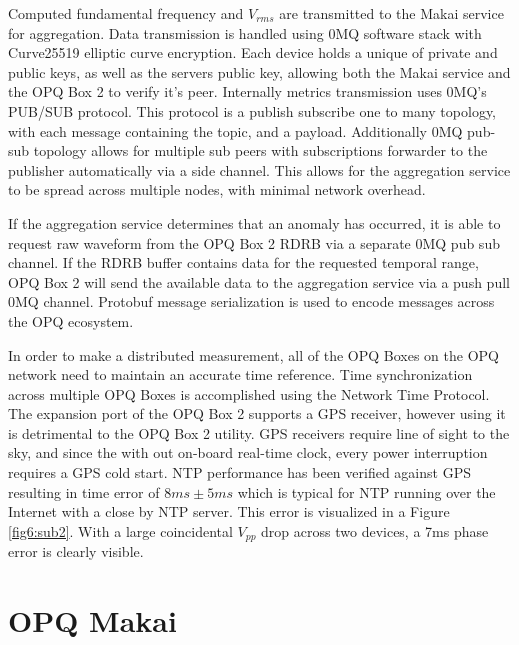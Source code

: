 Computed fundamental frequency and $V_{rms}$ are transmitted to the Makai service for aggregation. Data transmission is handled using 0MQ software stack with Curve25519 elliptic curve encryption. Each device holds a unique of private and public keys, as well as the servers public key, allowing both the Makai service and the OPQ Box 2 to verify it's peer. Internally metrics transmission uses 0MQ's PUB/SUB protocol. This protocol is a publish subscribe one to many topology, with each message containing the topic, and a payload. Additionally 0MQ pub-sub topology allows for multiple sub peers with subscriptions forwarder to the publisher automatically via a side channel. This allows for the aggregation service to be spread across multiple nodes, with minimal network overhead.

If the aggregation service determines that an anomaly has occurred, it is able to request raw waveform from the OPQ Box 2 RDRB via a separate 0MQ pub sub channel. If the RDRB buffer contains data for the requested temporal range, OPQ Box 2 will send the available data to the aggregation service via a push pull 0MQ channel. Protobuf message serialization is used to encode messages across the OPQ ecosystem. 

In order to make a distributed measurement, all of the OPQ Boxes on the OPQ network need to maintain an accurate time reference. Time synchronization across multiple OPQ Boxes is accomplished using the Network Time Protocol. The expansion port of the OPQ Box 2 supports a GPS receiver, however using it is detrimental to the OPQ Box 2 utility. GPS receivers require line of sight to the sky, and since the with out on-board real-time clock, every power interruption requires a GPS cold start. NTP performance has been verified against GPS resulting in time error of $8ms\pm 5ms$ which is typical for NTP running over the Internet with a close by NTP server. This error is visualized in a Figure \ref{fig6:sub2}. With a large coincidental $V_{pp}$ drop across two devices, a 7ms phase error is clearly visible.

\section{OPQ Makai}

